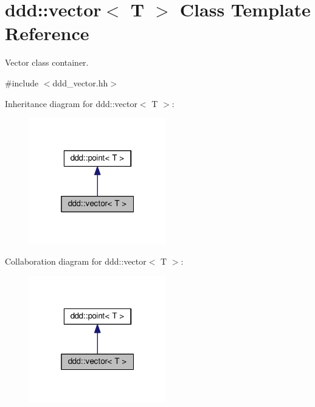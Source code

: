 \hypertarget{classddd_1_1vector}{}\section{ddd\+:\+:vector$<$ T $>$ Class Template Reference}
\label{classddd_1_1vector}


Vector class container.  




{\ttfamily \#include $<$ddd\+\_\+vector.\+hh$>$}



Inheritance diagram for ddd\+:\+:vector$<$ T $>$\+:\nopagebreak
\begin{figure}[H]
\begin{center}
\leavevmode
\includegraphics[width=169pt]{d6/df3/classddd_1_1vector__inherit__graph}
\end{center}
\end{figure}


Collaboration diagram for ddd\+:\+:vector$<$ T $>$\+:\nopagebreak
\begin{figure}[H]
\begin{center}
\leavevmode
\includegraphics[width=169pt]{d3/d01/classddd_1_1vector__coll__graph}
\end{center}
\end{figure}

